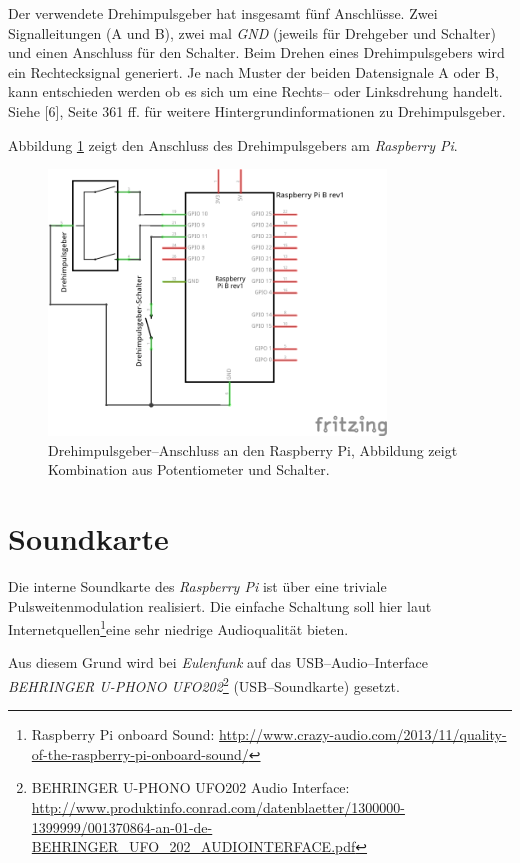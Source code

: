 \documentclass[11pt,ngerman,toc=listof,index=totoc]{scrreprt}
\begin{document}
Der verwendete Drehimpulsgeber hat insgesamt fünf Anschlüsse. Zwei
Signalleitungen (A und B), zwei mal \emph{GND} (jeweils für Drehgeber
und Schalter) und einen Anschluss für den Schalter. Beim Drehen eines
Drehimpulsgebers wird ein Rechtecksignal generiert. Je nach Muster der
beiden Datensignale A oder B, kann entschieden werden ob es sich um eine
Rechts-- oder Linksdrehung handelt. Siehe {[}6{]}, Seite 361 ff. für
weitere Hintergrundinformationen zu Drehimpulsgeber.

Abbildung \ref{alps} zeigt den Anschluss des Drehimpulsgebers am
\emph{Raspberry Pi}.

\begin{figure}[h!]
  \centering
\includegraphics[width=0.8\textwidth]{images/rotary.png}
  \caption{Drehimpulsgeber--Anschluss an den Raspberry Pi, Abbildung zeigt
  Kombination aus Potentiometer und Schalter.}
  \label{alps}
\end{figure}

\section{Soundkarte}\label{soundkarte}

Die interne Soundkarte des \emph{Raspberry Pi} ist über eine triviale
Pulsweitenmodulation realisiert. Die einfache Schaltung soll hier laut
Internetquellen\footnote{Raspberry Pi onboard Sound:
  \url{http://www.crazy-audio.com/2013/11/quality-of-the-raspberry-pi-onboard-sound/}}eine
sehr niedrige Audioqualität bieten.

Aus diesem Grund wird bei \emph{Eulenfunk} auf das USB--Audio--Interface
\emph{BEHRINGER U-PHONO UFO202}\footnote{BEHRINGER U-PHONO UFO202 Audio
  Interface:
  \url{http://www.produktinfo.conrad.com/datenblaetter/1300000-1399999/001370864-an-01-de-BEHRINGER_UFO_202_AUDIOINTERFACE.pdf}}
(USB--Soundkarte) gesetzt.
\end{document}
